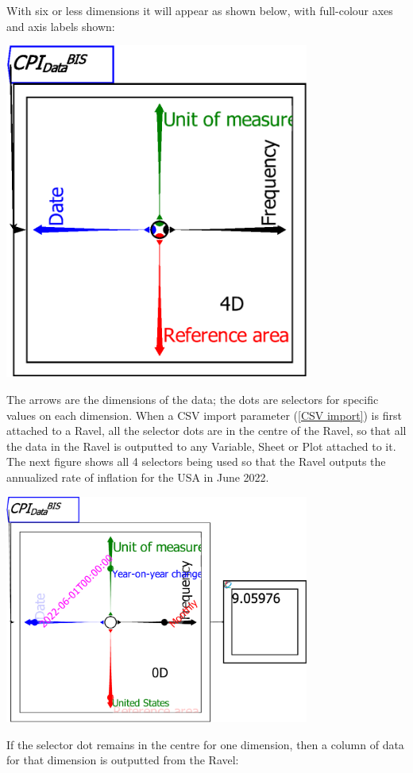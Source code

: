 With six or less dimensions it will appear as shown below, with full-colour
axes and axis labels shown:

\includegraphics[width=10cm]{images/RavelDataImporting02}

The arrows are the dimensions of the data; the dots are selectors
for specific values on each dimension. When a CSV import parameter
(\ref{CSV import}) is first attached to a Ravel, all the selector
dots are in the centre of the Ravel, so that all the data in the Ravel
is outputted to any Variable, Sheet or Plot attached to it. The next
figure shows all 4 selectors being used so that the Ravel outputs
the annualized rate of inflation for the USA in June 2022.

\includegraphics[width=10cm]{images/RavelSingleDataPointSelected}

If the selector dot remains in the centre for one dimension, then
a column of data for that dimension is outputted from the Ravel:

